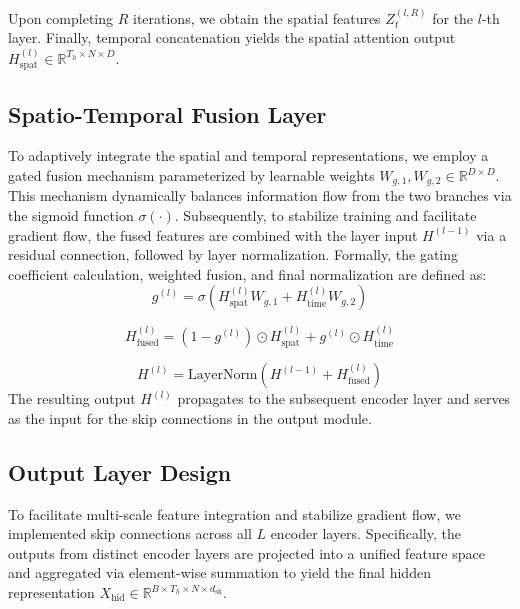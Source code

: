 \documentclass[5p,times,authoryear]{elsarticle}
\begin{document}
Upon completing $R$ iterations, we obtain the spatial features $Z_t^{(l, R)}$ for the $l$-th layer. Finally, temporal concatenation yields the spatial attention output $H_{\text{spat}}^{(l)} \in \mathbb{R}^{T_h \times N \times D}$.


\subsection{Spatio-Temporal Fusion Layer}
To adaptively integrate the spatial and temporal representations, we employ a gated fusion mechanism parameterized by learnable weights $W_{g,1}, W_{g,2} \in \mathbb{R}^{D \times D}$. This mechanism dynamically balances information flow from the two branches via the sigmoid function $\sigma(\cdot)$. Subsequently, to stabilize training and facilitate gradient flow, the fused features are combined with the layer input $H^{(l-1)}$ via a residual connection, followed by layer normalization. Formally, the gating coefficient calculation, weighted fusion, and final normalization are defined as:
\vspace{-3pt}
\begin{equation}
\label{eq:gate_mechanism}
g^{(l)} = \sigma \left( H_{\text{spat}}^{(l)} W_{g,1} + H_{\text{time}}^{(l)} W_{g,2} \right)
\end{equation}
\vspace{-10pt}

\begin{equation}
\label{eq:fusion_operation}
H_{\text{fused}}^{(l)} = (1 - g^{(l)}) \odot H_{\text{spat}}^{(l)} + g^{(l)} \odot H_{\text{time}}^{(l)}
\end{equation}
\vspace{-10pt}

\begin{equation}
\label{eq:layer_norm}
H^{(l)} = \text{LayerNorm}\left(H^{(l-1)} + H_{\text{fused}}^{(l)}\right)
\end{equation}
\vspace{-5pt}
The resulting output $H^{(l)}$ propagates to the subsequent encoder layer and serves as the input for the skip connections in the output module.




\subsection{Output Layer Design}
To facilitate multi-scale feature integration and stabilize gradient flow, we implemented skip connections across all $L$ encoder layers. Specifically, the outputs from distinct encoder layers are projected into a unified feature space and aggregated via element-wise summation to yield the final hidden representation $X_{\text{hid}} \in \mathbb{R}^{B \times T_h \times N \times d_{\text{sk}}}$.
\end{document}
